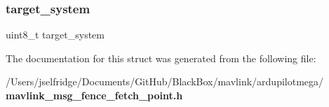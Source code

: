 \mbox{\label{struct____mavlink__fence__fetch__point__t_ac9afff43526a157e4c4e45607c1418b8}} 
\subsubsection{target\+\_\+system}
{\footnotesize\ttfamily uint8\+\_\+t target\+\_\+system}



The documentation for this struct was generated from the following file\+:\begin{DoxyCompactItemize}
\item 
/\+Users/jselfridge/\+Documents/\+Git\+Hub/\+Black\+Box/mavlink/ardupilotmega/\textbf{ mavlink\+\_\+msg\+\_\+fence\+\_\+fetch\+\_\+point.\+h}\end{DoxyCompactItemize}
